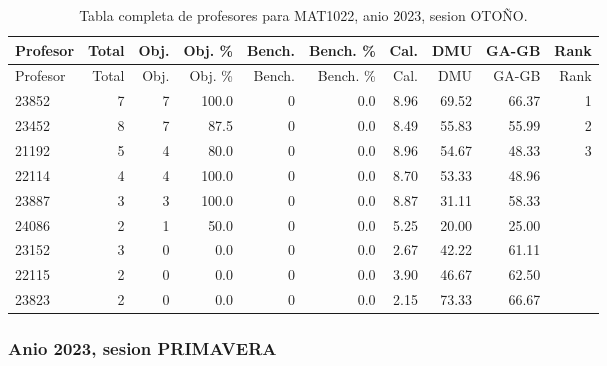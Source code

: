 \begingroup
\scriptsize
\setlength{\tabcolsep}{3pt}
\begin{longtable}{lrrrrrrrrr}
\caption{Tabla completa de profesores para MAT1022, anio 2023, sesion OTOÑO.}\label{tab:prof-period-mat1022-2023-oto-o}\\
\toprule
Profesor & Total & Obj. & Obj. \% & Bench. & Bench. \% & Cal. & DMU & GA-GB & Rank \\
\midrule
\endfirsthead
\toprule
Profesor & Total & Obj. & Obj. \% & Bench. & Bench. \% & Cal. & DMU & GA-GB & Rank \\
\midrule
\endhead
23852 & 7 & 7 & 100.0 & 0 & 0.0 & 8.96 & 69.52 & 66.37 & 1 \\
23452 & 8 & 7 & 87.5 & 0 & 0.0 & 8.49 & 55.83 & 55.99 & 2 \\
21192 & 5 & 4 & 80.0 & 0 & 0.0 & 8.96 & 54.67 & 48.33 & 3 \\
22114 & 4 & 4 & 100.0 & 0 & 0.0 & 8.70 & 53.33 & 48.96 &  \\
23887 & 3 & 3 & 100.0 & 0 & 0.0 & 8.87 & 31.11 & 58.33 &  \\
24086 & 2 & 1 & 50.0 & 0 & 0.0 & 5.25 & 20.00 & 25.00 &  \\
23152 & 3 & 0 & 0.0 & 0 & 0.0 & 2.67 & 42.22 & 61.11 &  \\
22115 & 2 & 0 & 0.0 & 0 & 0.0 & 3.90 & 46.67 & 62.50 &  \\
23823 & 2 & 0 & 0.0 & 0 & 0.0 & 2.15 & 73.33 & 66.67 &  \\
\bottomrule
\end{longtable}
\endgroup

\subsubsection{Anio 2023, sesion PRIMAVERA}

